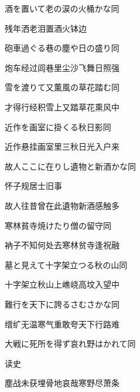 \begin{haiku}
    {\FH 酒を置いて老の涙の火桶かな}\hfill{\FH 同}

    {\FK 残年洒老泪置酒火钵边}
\end{haiku}

\begin{haiku}
    {\FH 砲車過ぐる巷の塵や日の盛り}\hfill{\FH 同}

    {\FK 炮车经过闾巷里尘沙飞舞日照强}
\end{haiku}

\begin{haiku}
    {\FH 雪を渡りて又薫風の草花踏む}\hfill{\FH 同}

    {\FK 才得行经积雪上又踏草花熏风中}
\end{haiku}

\begin{haiku}
    {\FH 近作を画室に掛くる秋日影}\hfill{\FH 同}

    {\FK 近作悬挂画室里三秋日光入户来}
\end{haiku}

\begin{haiku}
    {\FH 故人ここに在りし遺物と新酒かな}\hfill{\FH 同}

    {\FK 怀子规居士旧事}

    {\FK 故人往昔曾在此遺物新酒感触多}
\end{haiku}

\begin{haiku}
    {\FH 寒林貧寺焼けたり僧の留守}\hfill{\FH 同}

    {\FK 衲子不知何处去寒林贫寺逢祝融}
\end{haiku}

\begin{haiku}
    {\FH 墓と見えて十字架立つる秋の山}\hfill{\FH 同}

    {\FK 十字架立秋山上嶕峣高坟入望中}
\end{haiku}

\begin{haiku}
    {\FH 難行を天下に誇るさむさかな}\hfill{\FH 同}

    {\FK 缯纩无温寒气重敢夸天下行路难}
\end{haiku}

\begin{haiku}
    {\FH 大戦に死所を得ず哀れ野はかれて}\hfill{\FH 同}

    {\FK 读史}

    {\FK 塵战未获埋骨地哀哉寒野尽萧条}
\end{haiku}

